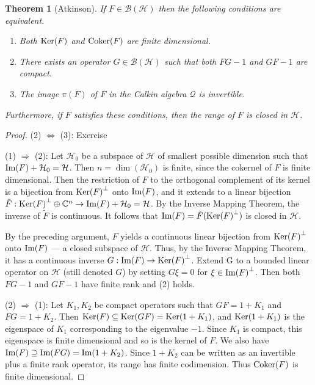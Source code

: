 \documentclass{book}
\newtheorem{theorem}[definition]{Theorem}
\begin{document}
\begin{theorem}[Atkinson]
  If \(F\in\mathcal{B}(\mathcal{H})\) then the following conditions are equivalent.
  \begin{enumerate}
    \item Both \(\textnormal{Ker}(F)\) and \(\textnormal{Coker}(F)\) are finite dimensional.
    \item There exists an operator \(G\in\mathcal{B}(\mathcal{H})\) such that both \(FG-1\) and \(GF-1\) are compact.
    \item The image \(\pi(F)\) of \(F\) in the Calkin algebra \(\mathcal{Q}\) is invertible.
  \end{enumerate}
  Furthermore, if \(F\) satisfies these conditions, then the range of \(F\) is closed in \(\mathcal{H}\).
\end{theorem}
\begin{proof}
  (2) \(\Leftrightarrow\) (3): Exercise\par
  (1) \(\Rightarrow\) (2): Let \(\mathcal{H}_0\)
be a subspace of \(\mathcal{H}\) of smallest possible dimension such that \(\textnormal{Im}(F) + \mathcal{H}_0 = \mathcal{H}\). Then
\(n = \dim(\mathcal{H}_0)\) is finite, since the cokernel of \(F\) is finite dimensional. Then the restriction
of \(F\) to the orthogonal complement of its kernel is a bijection from \({\textnormal{Ker}(F)}^\perp\) onto \(\textnormal{Im}(F)\),
and it extends to a linear bijection \(\tilde{F} : {\textnormal{Ker}(F)}^\perp\oplus \mathbb{C}^n \rightarrow \textnormal{Im}(F)+\mathcal{H}_0 = \mathcal{H}\). 
By the Inverse Mapping Theorem, the inverse of \(\tilde{F}\) is continuous. It follows that \(\textnormal{Im}(F) = \tilde{F}({\textnormal{Ker}(F)}^\perp)\)
is closed in \(\mathcal{H}\).\par
By the preceding argument, \(F\) yields a continuous linear bijection from \({\textnormal{Ker}(F)}^\perp\) onto
\(\textnormal{Im}(F)\) — a closed subspace of \(\mathcal{H}\). Thus, by the Inverse Mapping Theorem, it has a
continuous inverse \(G : \textnormal{Im}(F) \rightarrow {\textnormal{Ker}(F)}^\perp\). Extend G to a bounded linear operator on \(\mathcal{H}\)
  (still denoted \(G\)) by setting \(G\xi = 0\) for \(\xi \in {\textnormal{Im}(F)}^\perp\). Then both \(FG-1\) and \(GF-1\) have
  finite rank and (2) holds.\par
  (2) \(\Rightarrow\) (1): Let \(K_1,K_2\) be compact operators such that \(GF=1+K_1\) and \(FG=1+K_2\). Then
\(\textnormal{Ker}(F)\subseteq\textnormal{Ker}(GF)=\textnormal{Ker}(1+K_1)\), and \(\textnormal{Ker}(1+K_1)\) is the eigenspace of \(K_1\)
corresponding to the eigenvalue \(-1\). Since \(K_1\) is compact, this eigenspace is finite dimensional and so is the kernel of \(F\). We also have
\(\textnormal{Im}(F)\supseteq\textnormal{Im}(FG)=\textnormal{Im}(1+K_2)\). Since \(1+K_2\) can be written as an invertible plus a finite
  rank operator, its range has finite codimension. Thus \(\textnormal{Coker}(F)\) is finite dimensional.
\end{proof}
\end{document}
